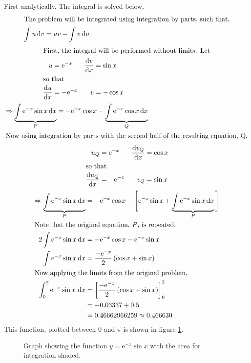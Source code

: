 \documentclass[11pt]{article} %
\newcommand{\inputTikZ}[1]{%
  }
\newcommand{\inputTikZ}[1]{%
    \beginpgfgraphicnamed{#1-external}%
    \endpgfgraphicnamed%
  }
\renewcommand{\d}{\,\mathrm{d}} %
\newcommand{\dx}[2]{\frac{\textrm{d} #1}{\textrm{d} #2}} %
\newcommand{\e}[1]{\text{e}^{#1}} %
\newcommand{\inter}[1]{\shortintertext{#1}}
\begin{document}
	First analytically. The integral is solved below.
	\begin{align*}
		\inter{The problem will be integrated using integration by parts, such that,}
		\int u \d v &= uv - \int v \d u \\
	\end{align*}
	\vspace{-1.5cm}
	\begin{align*}
		\inter{First, the integral will be performed without limits. Let}
		u &= \e{-x} & \dx{v}{x} &= \sin x\\
		\inter{so that}
		\dx{u}{x} &= -\e{-x} & v &= -\cos x\\
	\end{align*}
	\vspace{-1cm}
	\begin{align*}
		\Rightarrow \underbrace{\int \e{-x} \sin x\d x }_\text{P} &= -\e{-x}\cos x - \underbrace{\int \e{-x} \cos x \d x}_{Q} \\
		\inter{Now using integration by parts with the second half of the resulting equation, Q,}
	\end{align*}
	\vspace{-1.5cm}
	\begin{align*}
		u_Q &= \e{-x} & \dx{v_Q}{x} &= \cos x\\
		\inter{so that}
		\dx{u_Q}{x} &= -\e{-x} & v_Q &= \sin x\\
	\end{align*}
	\vspace{-1cm}
	\begin{align*}
		\Rightarrow \underbrace{\int \e{-x} \sin x \d x}_{P} &= -\e{-x} \cos x - \Bigg[ \e{-x} \sin x + \underbrace{\int \e{-x}\sin x \d x}_{P} \Bigg]\\
		\inter{Note that the original equation, $P$, is repeated,}
		2\int \e{-x} \sin x \d x &= -\e{-x} \cos x - \e{-x} \sin x \\
		\int \e{-x} \sin x \d x &= \frac{-\e{-x}}{2}\left(\cos x + \sin x\right) \\
		\inter{Now applying the limits from the original problem,}
		\int_0^2 \e{-x}\sin x\,\d x &= \left[ \frac{-\e{-x}}{2}\left(\cos x + \sin x\right)\right]_0^2\\
		 &= -0.03337 + 0.5\\
		 &= 0.46662966259 \approx 0.466630
	\end{align*}
	This function, plotted between $0$ and $\pi$ is shown in figure \ref{fig:graph1}.
	\begin{figure}[h]
			\centering
				\inputTikZ{Graph1}
			\caption{\label{fig:graph1}Graph showing the function $y = \e{-x}\sin x$ with the area for integration shaded.}
	\end{figure}
\end{document}
